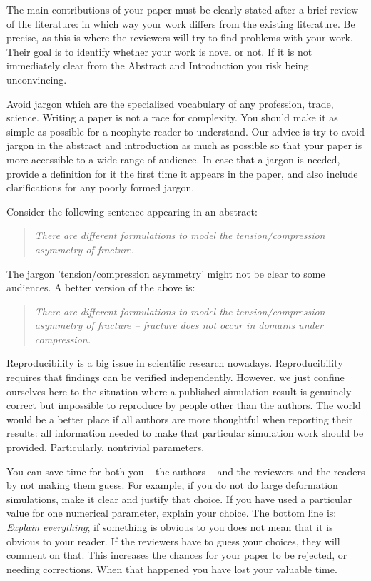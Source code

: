 \documentclass[authoryear,12pta4paper,fleqn]{article}
\numberwithin{equation}{section}
\theoremstyle{remark}
\begin{document}
The main contributions of your paper must be clearly stated after a brief review of the literature: in which way your work differs from the existing literature. Be precise, as this is where the reviewers will try to find problems with your work. Their goal is to identify whether your work is novel or not. If it is not immediately clear from the Abstract and Introduction you risk being unconvincing. 



Avoid jargon which are the specialized vocabulary of any profession, trade, science.  Writing a paper is not a race for complexity. You should make it as simple as possible for a neophyte reader to understand.
Our advice is try to avoid jargon in the abstract and introduction as much as possible so that your paper is more accessible to a wide range of audience. In case that a jargon is needed, provide a definition for it the first time it appears in the paper, and also include clarifications for any poorly formed jargon.

Consider the following sentence appearing in an abstract:

 \begin{quote}
  \textit{There are different formulations  to model the tension/compression asymmetry of fracture.}
 \end{quote}
The jargon 'tension/compression asymmetry' might not be clear to some audiences. A better version of the above is:

 \begin{quote}
    \textit{There are different formulations  to model the tension/compression asymmetry of 
    fracture – fracture does not occur in domains under compression.}
 \end{quote}


Reproducibility is a big issue in scientific research nowadays. Reproducibility requires that findings can be verified independently.
However, we just confine ourselves here to the situation where a published simulation result is genuinely correct but impossible to reproduce by people other than the authors. The world would be a better place if all authors are more thoughtful when reporting their results: all information needed to make that particular simulation work should be provided. Particularly, nontrivial parameters.


You can save time for both you -- the authors -- and the reviewers and the readers by not making them guess. For example, if you do not do large deformation simulations, make it clear and justify that choice. If you have used a particular value for one numerical parameter, explain your choice. The bottom line is: \textit{Explain everything}; if something is obvious to you does not mean that it is obvious to your reader. If the reviewers have to guess your choices, they will comment on that. This increases the chances for your paper to be rejected, or needing corrections. When that happened you have lost your valuable time.
\end{document}
